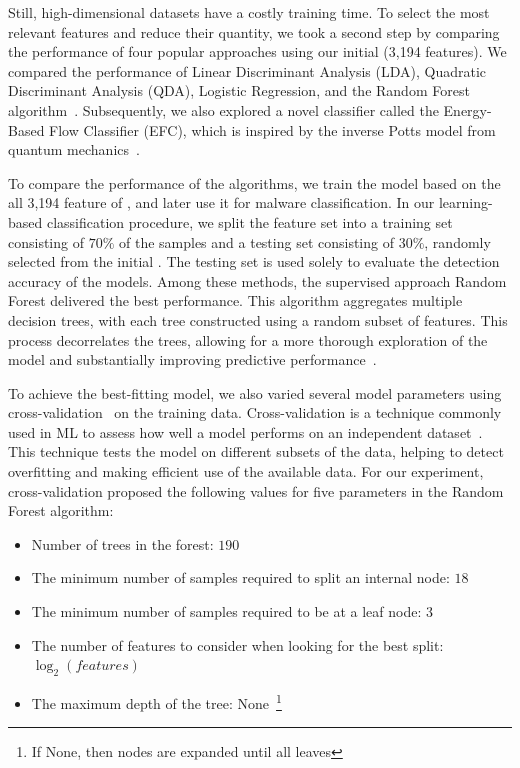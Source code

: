 Still, high-dimensional datasets have a costly training time. To select the most relevant features and reduce their quantity, we took a second step by comparing the performance of four popular approaches using our initial \fds (3,194 features). We compared the performance of Linear Discriminant Analysis (LDA), Quadratic Discriminant Analysis (QDA), Logistic Regression, and the Random Forest algorithm~\cite{james2023introduction}. Subsequently, we also explored a novel classifier called the Energy-Based Flow Classifier (EFC), which is inspired by the inverse Potts model from quantum mechanics~\cite{DBLP:journals/tnsm/PontesSGBM21}.


To compare the performance of the algorithms, we train the
model based on the all 3,194 feature of \fds, and later use it for malware classification. In our learning-based classification procedure,
we split the feature set into a training set consisting of $70\%$
of the samples and a testing set consisting of $30\%$, randomly
selected from the initial \fds. The testing set is used solely
to evaluate the detection accuracy of the models. Among these methods, the supervised approach Random Forest delivered the best performance. This algorithm aggregates multiple decision trees, with each tree constructed using a random subset of features. This process decorrelates the trees, allowing for a more thorough exploration of the model and substantially improving predictive performance~\cite{james2023introduction}.

To achieve the best-fitting model, we also varied several model parameters using cross-validation~\cite{DBLP:phd/us/Stephenson22} on the training data. Cross-validation is a technique commonly used in ML to assess how well a model performs on an independent dataset~\cite{DBLP:journals/jsan/AwadF23}. This technique tests the model on different subsets of the data, helping to detect overfitting and making efficient use of the available data. For our experiment, cross-validation proposed the following values for five parameters in the Random Forest algorithm:

\begin{itemize}
    \item Number of trees in the forest: $190$
    \item The minimum number of samples required to split an internal node: $18$
    \item The minimum number of samples required to be at a leaf node: $3$
    \item The number of features to consider when looking for the best split: $\log_2(features)$
    \item The maximum depth of the tree: None~\footnote{If None, then nodes are expanded until all leaves}
\end{itemize}

